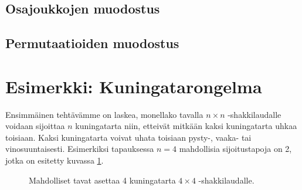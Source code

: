 \subsection{Osajoukkojen muodostus}

\subsection{Permutaatioiden muodostus}

\section{Esimerkki: Kuningatarongelma}

Ensimmäinen tehtävämme on
laskea, monellako tavalla $n \times n$ -shakkilaudalle voidaan
sijoittaa $n$ kuningatarta niin, etteivät mitkään kaksi kuningatarta
uhkaa toisiaan. Kaksi kuningatarta voivat uhata toisiaan
pysty-, vaaka- tai vinosuuntaisesti.
Esimerkiksi tapauksessa $n=4$ mahdollisia sijoitustapoja on 2,
jotka on esitetty kuvassa \ref{fig:kuning}.


\begin{figure}
\center
{}
\caption{Mahdolliset tavat asettaa 4 kuningatarta $4 \times 4$ -shakkilaudalle.}
\label{fig:kuning}
\end{figure}

